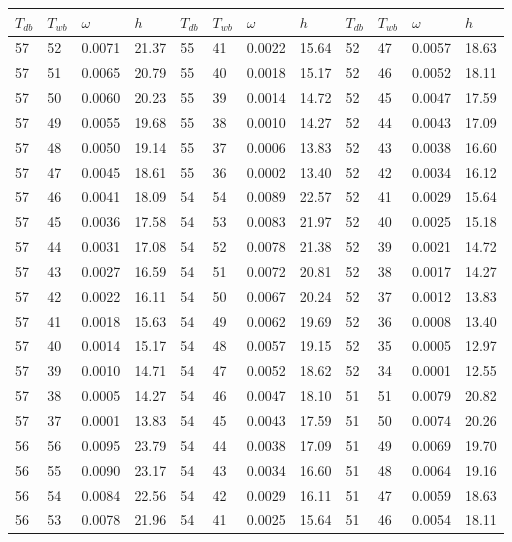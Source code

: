 \begin{tabular}{llll|llll|llll}
 \toprule 
\(T_{db}\) & \(T_{wb}\) & \(\omega\) & \(h\) & \(T_{db}\) & \(T_{wb}\) & \(\omega\) & \(h\) & \(T_{db}\) & \(T_{wb}\) & \(\omega\) & \(h\)  \\ \midrule 
57 & 52 & 0.0071 & 21.37 & 55 & 41 & 0.0022 & 15.64 & 52 & 47 & 0.0057 & 18.63\\
57 & 51 & 0.0065 & 20.79 & 55 & 40 & 0.0018 & 15.17 & 52 & 46 & 0.0052 & 18.11\\
57 & 50 & 0.0060 & 20.23 & 55 & 39 & 0.0014 & 14.72 & 52 & 45 & 0.0047 & 17.59\\
57 & 49 & 0.0055 & 19.68 & 55 & 38 & 0.0010 & 14.27 & 52 & 44 & 0.0043 & 17.09\\
57 & 48 & 0.0050 & 19.14 & 55 & 37 & 0.0006 & 13.83 & 52 & 43 & 0.0038 & 16.60\\
57 & 47 & 0.0045 & 18.61 & 55 & 36 & 0.0002 & 13.40 & 52 & 42 & 0.0034 & 16.12\\
57 & 46 & 0.0041 & 18.09 & 54 & 54 & 0.0089 & 22.57 & 52 & 41 & 0.0029 & 15.64\\
57 & 45 & 0.0036 & 17.58 & 54 & 53 & 0.0083 & 21.97 & 52 & 40 & 0.0025 & 15.18\\
57 & 44 & 0.0031 & 17.08 & 54 & 52 & 0.0078 & 21.38 & 52 & 39 & 0.0021 & 14.72\\
57 & 43 & 0.0027 & 16.59 & 54 & 51 & 0.0072 & 20.81 & 52 & 38 & 0.0017 & 14.27\\
57 & 42 & 0.0022 & 16.11 & 54 & 50 & 0.0067 & 20.24 & 52 & 37 & 0.0012 & 13.83\\
57 & 41 & 0.0018 & 15.63 & 54 & 49 & 0.0062 & 19.69 & 52 & 36 & 0.0008 & 13.40\\
57 & 40 & 0.0014 & 15.17 & 54 & 48 & 0.0057 & 19.15 & 52 & 35 & 0.0005 & 12.97\\
57 & 39 & 0.0010 & 14.71 & 54 & 47 & 0.0052 & 18.62 & 52 & 34 & 0.0001 & 12.55\\
57 & 38 & 0.0005 & 14.27 & 54 & 46 & 0.0047 & 18.10 & 51 & 51 & 0.0079 & 20.82\\
57 & 37 & 0.0001 & 13.83 & 54 & 45 & 0.0043 & 17.59 & 51 & 50 & 0.0074 & 20.26\\
56 & 56 & 0.0095 & 23.79 & 54 & 44 & 0.0038 & 17.09 & 51 & 49 & 0.0069 & 19.70\\
56 & 55 & 0.0090 & 23.17 & 54 & 43 & 0.0034 & 16.60 & 51 & 48 & 0.0064 & 19.16\\
56 & 54 & 0.0084 & 22.56 & 54 & 42 & 0.0029 & 16.11 & 51 & 47 & 0.0059 & 18.63\\
56 & 53 & 0.0078 & 21.96 & 54 & 41 & 0.0025 & 15.64 & 51 & 46 & 0.0054 & 18.11\\

\end{tabular}
